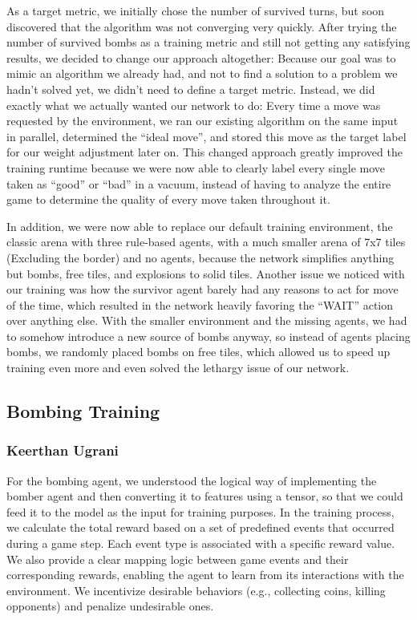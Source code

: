 As a target metric, we initially chose the number of survived turns, but soon discovered that the algorithm was not
converging very quickly.
After trying the number of survived bombs as a training metric and still not getting any satisfying results, we decided to
change our approach altogether:
Because our goal was to mimic an algorithm we already had, and not to find a solution to a problem we hadn't solved yet,
we didn't need to define a target metric.
Instead, we did exactly what we actually wanted our network to do:
Every time a move was requested by the environment, we ran our existing algorithm on the same input in parallel,
determined the \enquote{ideal move}, and stored this move as the target label for our weight adjustment later on.
This changed approach greatly improved the training runtime because we were now able to clearly label every single
move taken as \enquote{good} or \enquote{bad} in a vacuum, instead of having to analyze the entire game to determine the
quality of every move taken throughout it.

In addition, we were now able to replace our default training environment, the classic arena with three rule-based
agents, with a much smaller arena of 7x7 tiles (Excluding the border) and no agents, because the network simplifies
anything but bombs, free tiles, and explosions to solid tiles.
Another issue we noticed with our training was how the survivor agent barely had any reasons to act for move of the
time, which resulted in the network heavily favoring the \enquote{WAIT} action over anything else.
With the smaller environment and the missing agents, we had to somehow introduce a new source of bombs anyway, so
instead of agents placing bombs, we randomly placed bombs on free tiles, which allowed us to speed up training even more
and even solved the lethargy issue of our network.

\subsection{Bombing Training}
\subsubsection*{Keerthan Ugrani}
\label{subsec:training-bombing}

For the bombing agent, we understood the logical way of implementing the bomber agent and then converting it to features using a tensor, so that we could feed it to the model as the input for training purposes. In the training process, we calculate the total reward based on a set of predefined events that occurred during a game step. Each event type is associated with a specific reward value. We also provide a clear mapping logic between game events and their corresponding rewards, enabling the agent to learn from its interactions with the environment. We incentivize desirable behaviors (e.g., collecting coins, killing opponents) and penalize undesirable ones.

